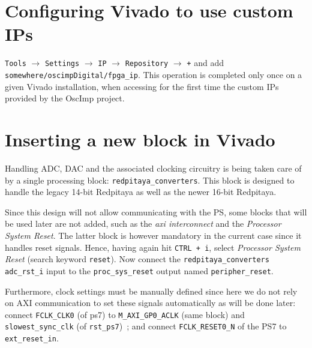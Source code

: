 \documentclass[10pt,oneside]{article}
\begin{document}
\noindent{}

\section{Configuring Vivado to use custom IPs}

{\tt Tools} $\rightarrow$ {\tt Settings} $\rightarrow$ {\tt IP} 
$\rightarrow$ {\tt Repository} $\rightarrow$ {\tt +} and add
{\tt somewhere/oscimpDigital/fpga\_ip}. This operation is completed only once on a given
Vivado installation, when accessing for the first time the custom IPs provided by
the OscImp project.

\section{Inserting a new block in Vivado}

Handling ADC, DAC and the associated clocking circuitry is being taken care
of by a single processing block: {\tt redpitaya\_converters}. This block is designed
to handle the legacy 14-bit Redpitaya as well as the newer 16-bit Redpitaya.

Since this design will not allow communicating with the PS, some blocks that will
be used later are not added, such as the {\em axi interconnect} and the
{\em Processor System Reset}. The latter block is however mandatory in the current case
since it handles reset signals. Hence, having again hit {\tt CTRL + i}, select 
{\em Processor System Reset} (search keyword {\tt reset}). Now connect the {\tt redpitaya\_converters}
{\tt adc\_rst\_i} input to the {\tt proc\_sys\_reset} output named {\tt peripher\_reset}.

Furthermore, clock settings must be manually defined since here we do not rely on AXI
communication to set these signals automatically as will be done later:
connect {\tt FCLK\_CLK0} (of ps7) to {\tt M\_AXI\_GP0\_ACLK} (same block) and 
{\tt slowest\_sync\_clk} (of {\tt rst\_ps7})~; and connect {\tt FCLK\_RESET0\_N} of the PS7
to {\tt ext\_reset\_in}.
\end{document}
